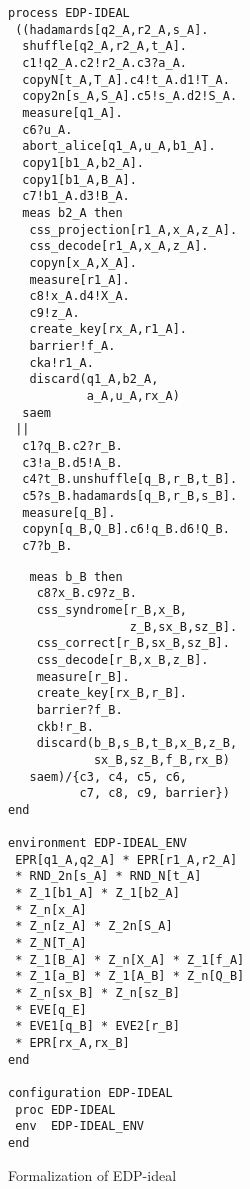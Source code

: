 \begin{figure}
\begin{minipage}{0.5\hsize}
\begin{verbatim}
process EDP-IDEAL
 ((hadamards[q2_A,r2_A,s_A].
  shuffle[q2_A,r2_A,t_A].
  c1!q2_A.c2!r2_A.c3?a_A.
  copyN[t_A,T_A].c4!t_A.d1!T_A.
  copy2n[s_A,S_A].c5!s_A.d2!S_A.
  measure[q1_A].
  c6?u_A.
  abort_alice[q1_A,u_A,b1_A].
  copy1[b1_A,b2_A].
  copy1[b1_A,B_A].
  c7!b1_A.d3!B_A.
  meas b2_A then
   css_projection[r1_A,x_A,z_A].
   css_decode[r1_A,x_A,z_A].
   copyn[x_A,X_A].
   measure[r1_A].
   c8!x_A.d4!X_A.
   c9!z_A.
   create_key[rx_A,r1_A].
   barrier!f_A.
   cka!r1_A.
   discard(q1_A,b2_A,
           a_A,u_A,rx_A)
  saem
 ||
  c1?q_B.c2?r_B.
  c3!a_B.d5!A_B.
  c4?t_B.unshuffle[q_B,r_B,t_B].
  c5?s_B.hadamards[q_B,r_B,s_B].
  measure[q_B].
  copyn[q_B,Q_B].c6!q_B.d6!Q_B.
  c7?b_B.
\end{verbatim}
\end{minipage}
\begin{minipage}{0.5\hsize}
\begin{verbatim}
   meas b_B then 
    c8?x_B.c9?z_B.
    css_syndrome[r_B,x_B,
                 z_B,sx_B,sz_B].
    css_correct[r_B,sx_B,sz_B].
    css_decode[r_B,x_B,z_B].
    measure[r_B].
    create_key[rx_B,r_B].
    barrier?f_B.
    ckb!r_B.
    discard(b_B,s_B,t_B,x_B,z_B,
            sx_B,sz_B,f_B,rx_B)
   saem)/{c3, c4, c5, c6, 
          c7, c8, c9, barrier})
end

environment EDP-IDEAL_ENV
 EPR[q1_A,q2_A] * EPR[r1_A,r2_A]
 * RND_2n[s_A] * RND_N[t_A]
 * Z_1[b1_A] * Z_1[b2_A]
 * Z_n[x_A] 
 * Z_n[z_A] * Z_2n[S_A]
 * Z_N[T_A]
 * Z_1[B_A] * Z_n[X_A] * Z_1[f_A]
 * Z_1[a_B] * Z_1[A_B] * Z_n[Q_B]
 * Z_n[sx_B] * Z_n[sz_B]
 * EVE[q_E]
 * EVE1[q_B] * EVE2[r_B]
 * EPR[rx_A,rx_B]
end

configuration EDP-IDEAL
 proc EDP-IDEAL
 env  EDP-IDEAL_ENV
end
\end{verbatim}
\end{minipage}
\caption{Formalization of EDP-ideal}
\end{figure}
